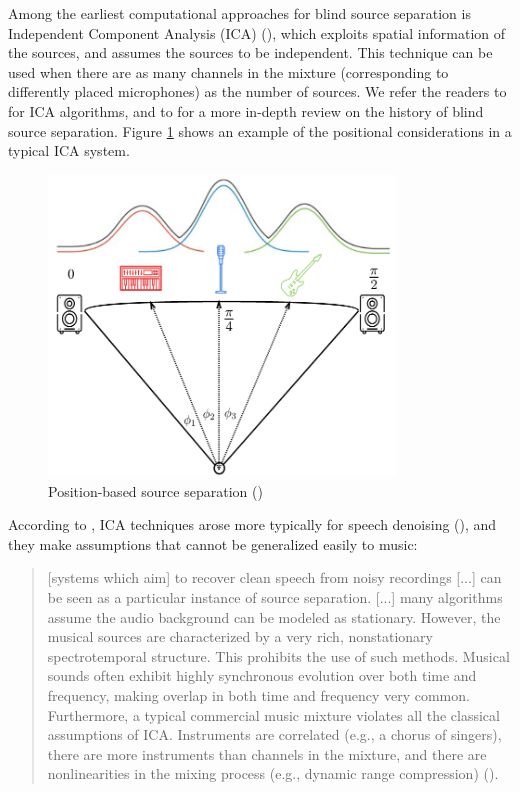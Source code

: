 \documentclass[report.tex]{subfiles}
\begin{document}
Among the earliest computational approaches for blind source separation is Independent Component Analysis (ICA)  (\cite{musicmask, musicsepgood, musicsepintro1}), which exploits spatial information of the sources, and assumes the sources to be independent. This technique can be used when there are as many channels in the mixture (corresponding to differently placed microphones) as the number of sources. We refer the readers to \textcite{ica1, ica2} for ICA algorithms, and to \textcite{blind1, blind2} for a more in-depth review on the history of blind source separation. Figure \ref{fig:icaposition} shows an example of the positional considerations in a typical ICA system.

\begin{figure}[ht]
	\centering
	\includegraphics[height=8cm]{./images-mss/positional.png}
	\caption{Position-based source separation (\cite[9]{musicsepgood})}
\label{fig:icaposition}
\end{figure}

According to \citeauthor{musicsepintro1}, ICA techniques arose more typically for speech denoising (\cite{speechsep}), and they make assumptions that cannot be generalized easily to music:

\begin{quote}
	[systems which aim] to recover clean speech from noisy recordings [...] can be seen as a particular instance of source separation. [...] many algorithms assume the audio background can be modeled as stationary. However, the musical sources are characterized by a very rich, nonstationary spectrotemporal structure. This prohibits the use of such methods. Musical sounds often exhibit highly synchronous evolution over both time and frequency, making overlap in both time and frequency very common. Furthermore, a typical commercial music mixture violates all the classical assumptions of ICA. Instruments are correlated (e.g., a chorus of singers), there are more instruments than channels in the mixture, and there are nonlinearities in the mixing process (e.g., dynamic range compression) (\cite[1]{musicsepintro1}).
\end{quote}
\end{document}

